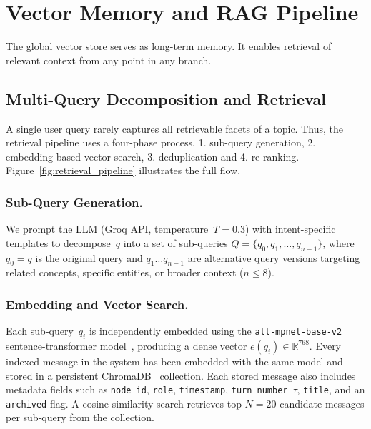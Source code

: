 \section{Vector Memory and RAG Pipeline}\label{subsec:rag}

The global vector store serves as long-term memory. It enables retrieval of relevant context from any point in any branch.

\subsection{Multi-Query Decomposition and Retrieval}\label{subsubsec:decomposition}

A single user query rarely captures all retrievable facets of a topic. Thus, the retrieval pipeline uses a four-phase process, 1. sub-query generation, 2. embedding-based vector search, 3. deduplication and 4. re-ranking. Figure~\ref{fig:retrieval_pipeline} illustrates the full flow.

\subsubsection{Sub-Query Generation.}
We prompt the LLM (Groq API, temperature~$T{=}0.3$) with intent-specific templates to decompose~$q$ into a set of sub-queries $Q = \{q_0, q_1, \dots, q_{n-1}\}$, where $q_0 = q$ is the original query and $q_1 \dots q_{n-1}$ are alternative query versions targeting related concepts, specific entities, or broader context ($n \leq 8$).






\subsubsection{Embedding and Vector Search.}
Each sub-query~$q_i$ is independently embedded using the \texttt{all-mpnet-base-v2} sentence-transformer model~\cite{reimers2019sentencebert}, producing a dense vector $e(q_i) \in \mathbb{R}^{768}$. Every indexed message in the system has been embedded with the same model and stored in a persistent ChromaDB~\cite{chromadb} collection. Each stored message also includes metadata fields such as \texttt{node\_id}, \texttt{role}, \texttt{timestamp}, \texttt{turn\_number}~$\tau$, \texttt{title}, and an \texttt{archived} flag. A cosine-similarity search retrieves top $N{=}20$ candidate messages per sub-query from the collection.

